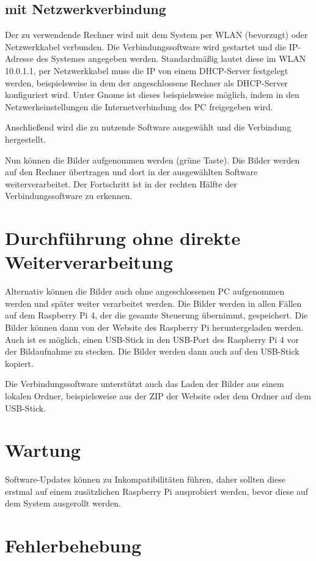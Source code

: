\documentclass[./00PhotoBox.tex]{subfiles}
\begin{document}
\subsection{mit Netzwerkverbindung}
Der zu verwendende Rechner wird mit dem System per WLAN (bevorzugt) oder Netzwerkkabel verbunden. Die Verbindungssoftware wird gestartet und die IP-Adresse des Systemes angegeben werden. Standardmäßig lautet diese im WLAN 10.0.1.1, per Netzwerkkabel muss die IP von einem DHCP-Server festgelegt werden, beispielsweise in dem der angeschlossene Rechner als DHCP-Server konfiguriert wird. Unter Gnome ist dieses beispielsweise möglich, indem in den Netzwerkeinstellungen die Internetverbindung des PC freigegeben wird.

Anschließend wird die zu nutzende Software ausgewählt und die Verbindung hergestellt.

Nun können die Bilder aufgenommen werden (grüne Taste). Die Bilder werden auf den Rechner übertragen und dort in der ausgewählten Software weiterverarbeitet. Der Fortschritt ist in der rechten Hälfte der Verbindungssoftware zu erkennen.

\section{Durchführung ohne direkte Weiterverarbeitung}
Alternativ können die Bilder auch ohne angeschlossenen PC aufgenommen werden und später weiter verarbeitet werden. Die Bilder werden in allen Fällen auf dem Raspberry Pi 4, der die gesamte Steuerung übernimmt, gespeichert. Die Bilder können dann von der Website des Raspberry Pi heruntergeladen werden. Auch ist es möglich, einen USB-Stick in den USB-Port des Raspberry Pi 4 vor der Bildaufnahme zu stecken. Die Bilder werden dann auch auf den USB-Stick kopiert.

Die Verbindungssoftware unterstützt auch das Laden der Bilder aus einem lokalen Ordner, beispielsweise aus der ZIP der Website oder dem Ordner auf dem USB-Stick.

\section{Wartung}
Software-Updates können zu Inkompatibilitäten führen, daher sollten diese erstmal auf einem zusätzlichen Raspberry Pi ausprobiert werden, bevor diese auf dem System ausgerollt werden.

\section{Fehlerbehebung}
\label{sec:Problembehandlung}
\end{document}
